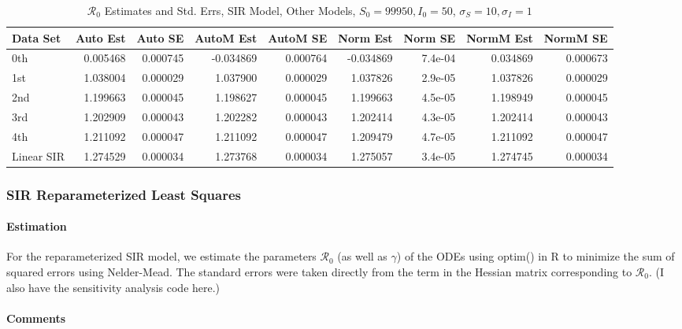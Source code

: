 \documentclass[12pt]{article}
\newcommand{\rr}{\ensuremath{\mathcal{R}_0}}
\begin{document}
\begin{table}[H]
	
	\caption{$\rr$ Estimates and Std. Errs, SIR Model,
		Other Models, $S_0 = 99950, I_0 = 50$, 
		$\sigma_S = 10, \sigma_I = 1$}
	\begin{footnotesize}
		\hskip -1cm
	\begin{tabular}{l|r|r|r|r|r|r|r|r}
		\hline
		Data Set & Auto Est & Auto SE & AutoM Est & AutoM SE & Norm Est & Norm SE & NormM Est & NormM SE\\
		\hline
		0th & 0.005468 & 0.000745 & -0.034869 & 0.000764 & -0.034869 & 7.4e-04 & 0.034869 & 0.000673\\
		\hline
		1st & 1.038004 & 0.000029 & 1.037900 & 0.000029 & 1.037826 & 2.9e-05 & 1.037826 & 0.000029\\
		\hline
		2nd & 1.199663 & 0.000045 & 1.198627 & 0.000045 & 1.199663 & 4.5e-05 & 1.198949 & 0.000045\\
		\hline
		3rd & 1.202909 & 0.000043 & 1.202282 & 0.000043 & 1.202414 & 4.3e-05 & 1.202414 & 0.000043\\
		\hline
		4th & 1.211092 & 0.000047 & 1.211092 & 0.000047 & 1.209479 & 4.7e-05 & 1.211092 & 0.000047\\
		\hline
		Linear SIR & 1.274529 & 0.000034 & 1.273768 & 0.000034 & 1.275057 & 3.4e-05 & 1.274745 & 0.000034\\
		\hline
	\end{tabular}
\end{footnotesize}
\end{table}

\subsubsection{SIR Reparameterized Least Squares}

\paragraph{Estimation}

For the reparameterized SIR model, we estimate the parameters $\rr$ (as well as $\gamma$) of the ODEs using optim() in R to minimize the sum of squared errors using Nelder-Mead. The standard errors were taken directly from the term in the Hessian matrix corresponding to $\rr$. (I also have the sensitivity analysis code here.)

\paragraph{Comments}
\end{document}
